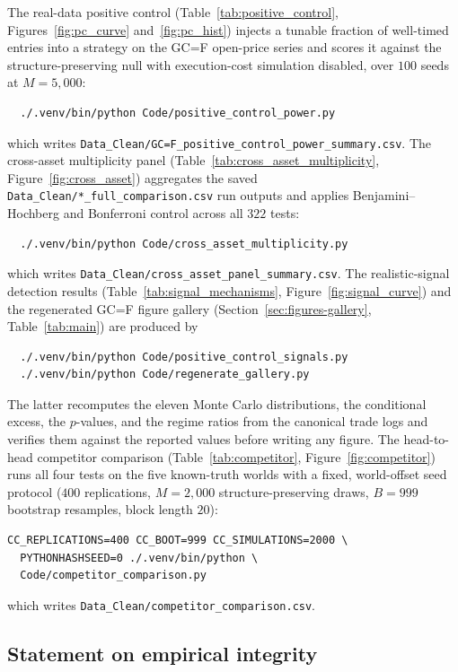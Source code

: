 \documentclass[preprint,12pt]{elsarticle}
\theoremstyle{definition}
\begin{document}
The real-data positive control (Table~\ref{tab:positive_control}, Figures~\ref{fig:pc_curve} and~\ref{fig:pc_hist}) injects a tunable fraction of well-timed entries into a strategy on the GC=F open-price series and scores it against the structure-preserving null with execution-cost simulation disabled, over $100$ seeds at $M=5{,}000$:
\begin{verbatim}
  ./.venv/bin/python Code/positive_control_power.py
\end{verbatim}
which writes \texttt{Data\_Clean/\allowbreak GC=F\_positive\_control\_power\_summary.csv}. The cross-asset multiplicity panel (Table~\ref{tab:cross_asset_multiplicity}, Figure~\ref{fig:cross_asset}) aggregates the saved \texttt{Data\_Clean/*\_full\_comparison.csv} run outputs and applies Benjamini--Hochberg and Bonferroni control across all $322$ tests:
\begin{verbatim}
  ./.venv/bin/python Code/cross_asset_multiplicity.py
\end{verbatim}
which writes \texttt{Data\_Clean/cross\_asset\_panel\_summary.csv}. The realistic-signal detection results (Table~\ref{tab:signal_mechanisms}, Figure~\ref{fig:signal_curve}) and the regenerated GC=F figure gallery (Section~\ref{sec:figures-gallery}, Table~\ref{tab:main}) are produced by
\begin{verbatim}
  ./.venv/bin/python Code/positive_control_signals.py
  ./.venv/bin/python Code/regenerate_gallery.py
\end{verbatim}
The latter recomputes the eleven Monte Carlo distributions, the conditional excess, the $p$-values, and the regime ratios from the canonical trade logs and verifies them against the reported values before writing any figure. The head-to-head competitor comparison (Table~\ref{tab:competitor}, Figure~\ref{fig:competitor}) runs all four tests on the five known-truth worlds with a fixed, world-offset seed protocol ($400$ replications, $M=2{,}000$ structure-preserving draws, $B=999$ bootstrap resamples, block length $20$):
\begin{verbatim}
CC_REPLICATIONS=400 CC_BOOT=999 CC_SIMULATIONS=2000 \
  PYTHONHASHSEED=0 ./.venv/bin/python \
  Code/competitor_comparison.py
\end{verbatim}
which writes \texttt{Data\_Clean/competitor\_comparison.csv}.

\subsection{Statement on empirical integrity}
\end{document}
